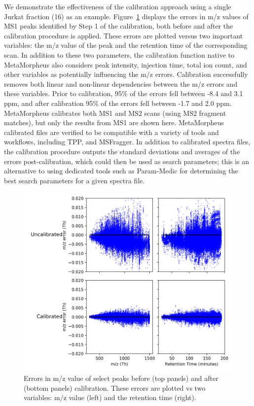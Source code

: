 \documentclass[journal=jprobs,manuscript=article]{achemso}
\begin{document}
We demonstrate the effectiveness of the calibration approach using a single Jurkat fraction (16) as an example.
Figure~\ref{fgr:fig1-calibErrors} displays the errors in m/z values of MS1 peaks identified by Step 1 of the calibration, both before and after the calibration procedure is applied.
These errors are plotted versus two important variables: the m/z value of the peak and the retention time of the corresponding scan.
In addition to these two parameters, the calibration function native to MetaMorpheus also considers peak intensity, injection time, total ion count, and other variables as potentially influencing the m/z errors.
Calibration successfully removes both linear and non-linear dependencies between the m/z errors and these variables.
Prior to calibration, 95\% of the errors fell between -8.4 and 3.1 ppm, and after calibration 95\% of the errors fell between -1.7 and 2.0 ppm.
MetaMorpheus calibrates both MS1 and MS2 scans (using MS2 fragment matches), but only the results from MS1 are shown here.
MetaMorpheus calibrated files are verified to be compatible with a variety of tools and workflows, including TPP\citep{Deutsch2010}, and MSFragger\citep{Kong_2017}.
In addition to calibrated spectra files, the calibration procedure outputs the standard deviations and averages of the errors post-calibration, which could then be used as search parameters; this is an alternative to using dedicated tools such as Param-Medic\citep{May2017} for determining the best search parameters for a given spectra file.

\begin{figure}[H]
 \includegraphics{fig1-calibErrors.png}
 \caption{Errors in m/z value of select peaks before (top panels) and after (bottom panels) calibration. These errors are plotted vs two variables: m/z value (left) and the retention time (right).}
 \label{fgr:fig1-calibErrors}
\end{figure}
\end{document}
